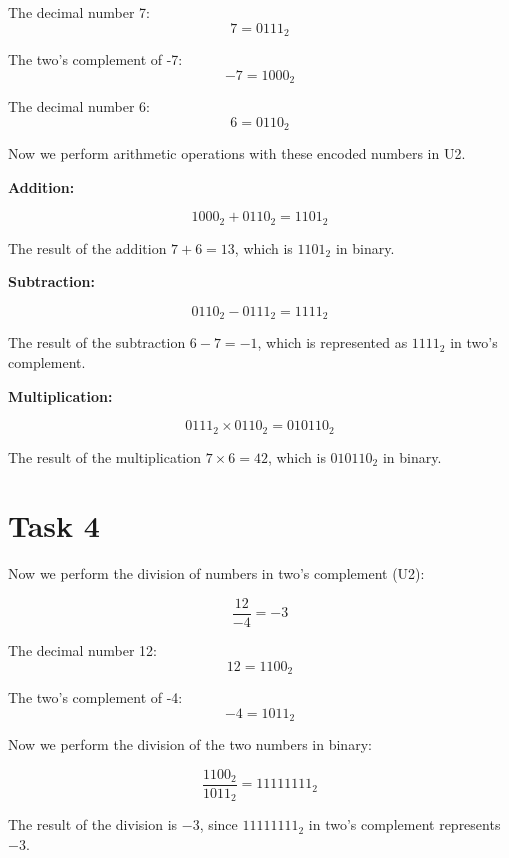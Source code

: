 \documentclass{article}
\begin{document}
The decimal number 7:
\[
7 = 0111_2
\]

The two's complement of -7:
\[
-7 = 1000_2
\]

The decimal number 6:
\[
6 = 0110_2
\]

Now we perform arithmetic operations with these encoded numbers in U2.

\textbf{Addition:}

\[
1000_2 + 0110_2 = 1101_2
\]

The result of the addition \( 7 + 6 = 13 \), which is \( 1101_2 \) in binary.

\textbf{Subtraction:}

\[
0110_2 - 0111_2 = 1111_2
\]

The result of the subtraction \( 6 - 7 = -1 \), which is represented as \( 1111_2 \) in two's complement.

\textbf{Multiplication:}

\[
0111_2 \times 0110_2 = 010110_2
\]

The result of the multiplication \( 7 \times 6 = 42 \), which is \( 010110_2 \) in binary.

\section*{Task 4}

Now we perform the division of numbers in two's complement (U2):

\[
\frac{12}{-4} = -3
\]

The decimal number 12:
\[
12 = 1100_2
\]

The two's complement of -4:
\[
-4 = 1011_2
\]

Now we perform the division of the two numbers in binary:

\[
\frac{1100_2}{1011_2} = 11111111_2
\]

The result of the division is \( -3 \), since \( 11111111_2 \) in two's complement represents \( -3 \).
\end{document}
